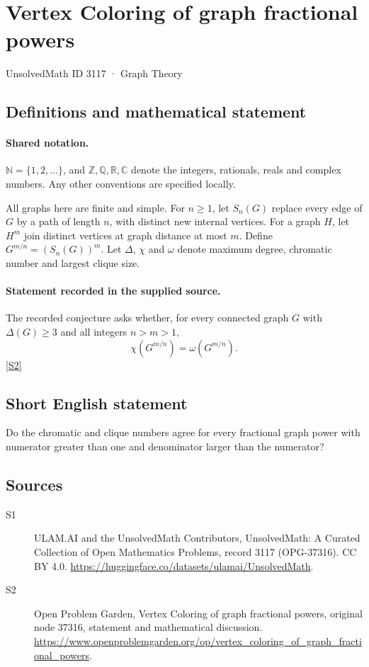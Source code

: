 \documentclass[11pt]{article}
\newcommand{\sref}[2]{\hyperlink{source:#1:#2}{[S#2]}}
\begin{document}
\setcounter{section}{3116}
\section{Vertex Coloring of graph fractional powers}\label{3117}
{\small\sffamily UnsolvedMath ID 3117 · Graph Theory}
\subsection{Definitions and mathematical statement}

\paragraph{Shared notation.}$\mathbb N=\{1,2,\ldots\}$, and $\mathbb Z,\mathbb Q,\mathbb R,\mathbb C$ denote the integers, rationals, reals and complex numbers. Any other conventions are specified locally.


All graphs here are finite and simple. For $n\ge1$, let $S_n(G)$ replace every edge of $G$ by a path of length $n$, with distinct new internal vertices. For a graph $H$, let $H^m$ join distinct vertices at graph distance at most $m$. Define $G^{m/n}=(S_n(G))^m$. Let $\Delta$, $\chi$ and $\omega$ denote maximum degree, chromatic number and largest clique size.
\paragraph{Statement recorded in the supplied source.}
The recorded conjecture asks whether, for every connected graph $G$ with $\Delta(G)\ge3$ and all integers $n>m>1$, \[\chi(G^{m/n})=\omega(G^{m/n}).\] \sref{3117}{2}
\subsection{Short English statement}
Do the chromatic and clique numbers agree for every fractional graph power with numerator greater than one and denominator larger than the numerator?
\subsection{Sources}
\begin{description}
\item[\hypertarget{source:3117:1}{S1}] ULAM.AI and the UnsolvedMath Contributors, UnsolvedMath: A Curated Collection of Open Mathematics Problems, record 3117 (OPG-37316). CC BY 4.0. \url{https://huggingface.co/datasets/ulamai/UnsolvedMath}.
\item[\hypertarget{source:3117:2}{S2}] Open Problem Garden, Vertex Coloring of graph fractional powers, original node 37316, statement and mathematical discussion. \url{https://www.openproblemgarden.org/op/vertex_coloring_of_graph_fractional_powers}.
\end{description}
\label{end:3117}
\end{document}
